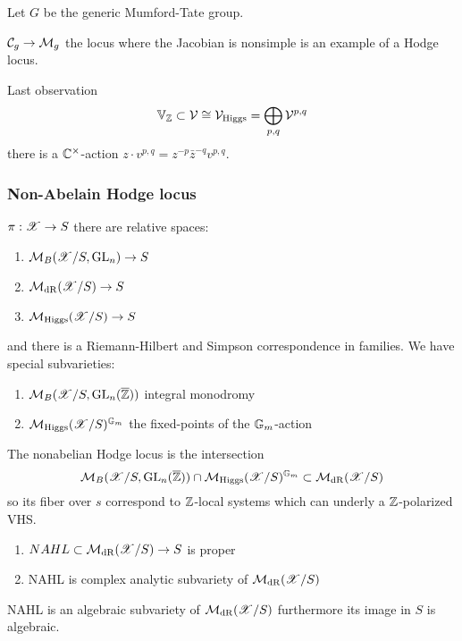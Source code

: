 \documentclass[12pt]{article}
\begin{document}
Let $G$ be the generic Mumford-Tate group.

\begin{example}
$\mathcal{C}_g \to \mathcal{M}_g$ the locus where the Jacobian is nonsimple is an example of a Hodge locus. 
\end{example}

Last observation 
\[ \mathbb{V}_{\mathbb{Z}} \subset \mathcal{V} \cong \mathcal{V}_{\text{Higgs}} = \bigoplus_{p,q} \mathcal{V}^{p,q} \]
there is a $\mathbb{C}^\times$-action $z \cdot v^{p,q} = z^{-p} \bar{z}^{-q} v^{p,q}$. 

\subsubsection{Non-Abelain Hodge locus}

$\pi : \mathscr{X} \to S$ there are relative spaces:
\begin{enumerate}
\item $\mathcal{M}_B(\mathscr{X}/S, \mathrm{GL}_n) \to S$
\item $\mathcal{M}_{\mathrm{dR}}(\mathscr{X}/S) \to S$
\item $\mathcal{M}_{\mathrm{Higgs}}(\mathscr{X}/S) \to S$
\end{enumerate}
and there is a Riemann-Hilbert and Simpson correspondence in families. We have special subvarieties:
\begin{enumerate}
\item $\mathcal{M}_B(\mathscr{X}/S, \mathrm{GL}_n(\overline{\mathbb{Z}}))$ integral monodromy
\item $\mathcal{M}_{\mathrm{Higgs}}(\mathscr{X}/S)^{\mathbb{G}_m}$ the fixed-points of the $\mathbb{G}_m$-action
\end{enumerate}

\begin{defn}
The nonabelian Hodge locus is the intersection
\[ \mathcal{M}_B(\mathscr{X}/S, \mathrm{GL}_n(\overline{\mathbb{Z}})) \cap \mathcal{M}_{\mathrm{Higgs}}(\mathscr{X}/S)^{\mathbb{G}_m} \subset \mathcal{M}_{\mathrm{dR}}(\mathscr{X}/S) \]
so its fiber over $s$ correspond to $\mathbb{Z}$-local systems which can underly a $\mathbb{Z}$-polarized VHS.
\end{defn}

\begin{theorem}[Simpson]
\begin{enumerate}
\item $NAHL \subset \mathcal{M}_{\mathrm{dR}}(\mathscr{X}/S) \to S$ is proper 
\item NAHL is complex analytic subvariety of $\mathcal{M}_{\mathrm{dR}}(\mathscr{X}/S)$
\end{enumerate}
\end{theorem}

\begin{conj}
NAHL is an algebraic subvariety of $\mathcal{M}_{\mathrm{dR}}(\mathscr{X}/S)$ furthermore its image in $S$ is algebraic. 
\end{conj}
\end{document}
